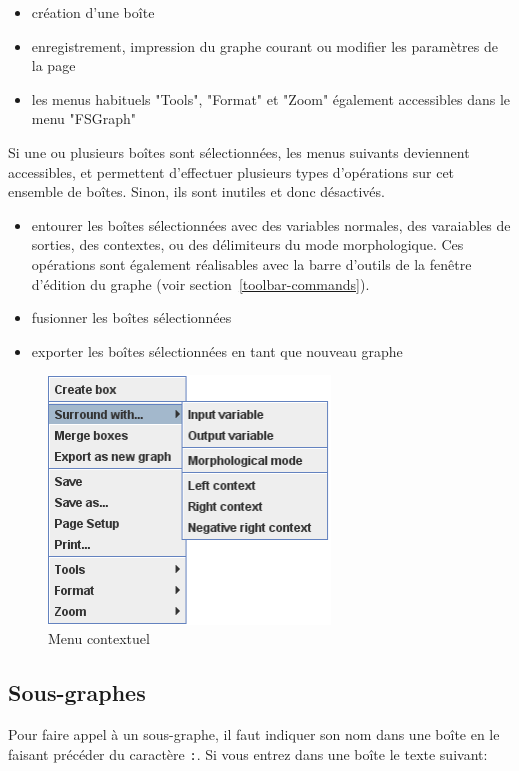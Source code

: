\begin{itemize}
\item création d'une boîte
\item enregistrement, impression du graphe courant ou modifier les paramètres de la page
\item les menus habituels "Tools", "Format" et "Zoom" également accessibles dans le menu "FSGraph"
\end{itemize}
Si une ou plusieurs boîtes sont sélectionnées, les menus suivants deviennent accessibles, et
permettent d'effectuer plusieurs types d'opérations sur cet ensemble de boîtes. Sinon, ils sont
inutiles et donc désactivés. 
\begin{itemize}
\item entourer les boîtes sélectionnées avec des variables normales, des varaiables de sorties, des
contextes, ou des délimiteurs du mode morphologique. Ces opérations sont également réalisables avec
la barre d'outils de la fenêtre d'édition du graphe (voir section~\ref{toolbar-commands}). 
\item fusionner les boîtes sélectionnées
\item exporter les boîtes sélectionnées en tant que nouveau graphe
\end{itemize}
\bigskip
\begin{figure}[!h]
\begin{center}
\includegraphics[width=7.5cm]{resources/img/fig5-6b.png}
\caption{Menu contextuel\label{contextual-menu}}
\end{center}
\end{figure}



\subsection{Sous-graphes}
\label{section-subgraphs}
\index{\verb+:+}
Pour faire appel à un sous-graphe, il faut indiquer son nom dans une boîte en le faisant
précéder du caractère \verb+:+. Si vous entrez dans une boîte le texte suivant:

